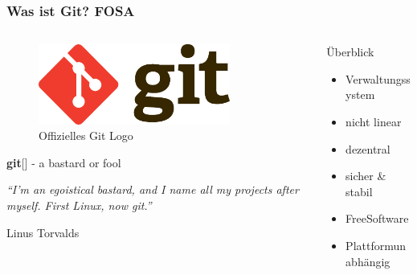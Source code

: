 \begin{frame}
	\frametitle{Was ist Git? \hfill{} \footnotesize{FOSA}}
	\begin{columns}
		\begin{column}{5cm}
			\begin{figure}
				\centering
				\includegraphics[width=0.8\textwidth]{git_logo.pdf}
				\caption{Offizielles Git Logo}
			\end{figure}
			\footnotesize{
				\textbf{git}[] - a bastard or fool
				\epigraph{\textit{"`I'm an egoistical bastard, and I name all 
				my projects after myself. First Linux, 
				now git."'}}{Linus Torvalds}
			}\normalsize
		\end{column}
		\begin{column}{5cm}
			\begin{block}{Überblick}
				\begin{itemize}
					\item Verwaltungssystem
					\item nicht linear
					\item dezentral
					\item sicher \& stabil
					\item FreeSoftware
					\item Plattformunabhängig
				\end{itemize}
			\end{block}
		\end{column}
	\end{columns}
\end{frame}

